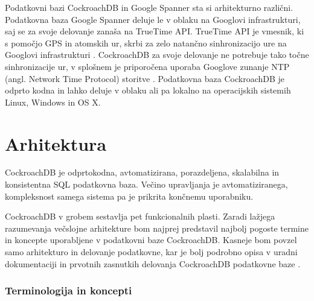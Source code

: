 \documentclass[a4paper, 12pt]{book}
\begin{document}
Podatkovni bazi CockroachDB in Google Spanner sta si arhitekturno različni. Podatkovna baza Google Spanner deluje le v oblaku na Googlovi infrastrukturi, saj se za svoje delovanje zanaša na TrueTime API. TrueTime API je vmesnik, ki s pomočjo GPS in atomskih ur, skrbi za zelo natančno sinhronizacijo ure na Googlovi infrastrukturi \cite{Corbett:2013:SGG:2518037.2491245}. CockroachDB za svoje delovanje ne potrebuje tako točne sinhronizacije ur, v splošnem je priporočena uporaba Googlove zunanje NTP (angl. Network Time Protocol) storitve \cite{CRDB-ntpd-configuration}. Podatkovna baza CockroachDB je odprto kodna in lahko deluje v oblaku ali pa lokalno na operacijskih sistemih Linux, Windows in OS X.

\section{Arhitektura}

CockroachDB je odprtokodna, avtomatizirana, porazdeljena, skalabilna in konsistentna SQL podatkovna baza. Večino upravljanja je avtomatiziranega, kompleksnost samega sistema pa je prikrita končnemu uporabniku. 

CockroachDB v grobem sestavlja pet funkcionalnih plasti. Zaradi lažjega razumevanja večslojne arhitekture bom najprej predstavil najbolj pogoste termine in koncepte uporabljene v podatkovni baze CockroachDB. Kasneje bom povzel samo arhitekturo in delovanje podatkovne, kar je bolj podrobno opisa v uradni dokumentaciji \cite{CRDB-home} in prvotnih zasnutkih delovanja CockroachDB podatkovne baze \cite{CRDB-design}.

\subsubsection{Terminologija in koncepti}
\end{document}

